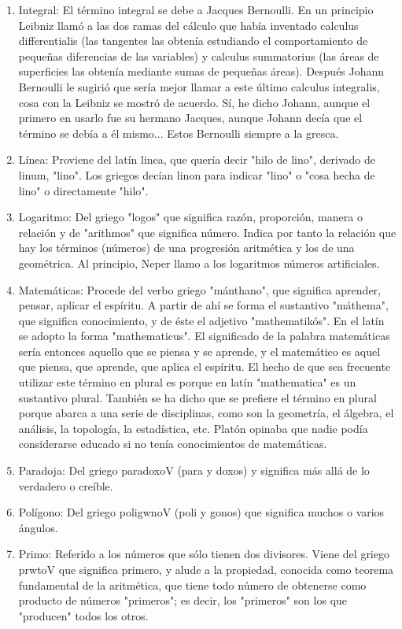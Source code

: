 \documentclass{mylib/reporte}
\begin{document}
\begin{enumerate}
	\item Integral: El término integral se debe a Jacques Bernoulli. En un principio Leibniz llamó a las dos ramas del cálculo que había inventado calculus differentialis (las tangentes las obtenía estudiando el comportamiento de pequeñas diferencias de las variables) y calculus summatorius (las áreas de superficies las obtenía mediante sumas de pequeñas áreas). Después Johann Bernoulli le sugirió que sería mejor llamar a este último calculus integralis, cosa con la Leibniz se mostró de acuerdo. Sí, he dicho Johann, aunque el primero en usarlo fue su hermano Jacques, aunque Johann decía que el término se debía a él mismo... Estos Bernoulli siempre a la gresca.
	\item Línea: Proviene del latín linea, que quería decir "hilo de lino", derivado de linum, "lino". Los griegos decían linon para indicar "lino" o "cosa hecha de lino" o directamente "hilo".
	\item Logaritmo: Del griego "logos" que significa razón, proporción, manera o relación y de "arithmos" que significa número. Indica por tanto la relación que hay los términos (números) de una progresión aritmética y los de una geométrica. Al principio, Neper llamo a los logaritmos números artificiales.
	\item Matemáticas: Procede del verbo griego "mánthano", que significa aprender, pensar, aplicar el espíritu. A partir de ahí se forma el sustantivo "máthema", que significa conocimiento, y de éste el adjetivo "mathematikós". En el latín se adopto la forma "mathematicus". El significado de la palabra matemáticas sería entonces aquello que se piensa y se aprende, y el matemático es aquel que piensa, que aprende, que aplica el espíritu. El hecho de que sea frecuente utilizar este término en plural es porque en latín "mathematica" es un sustantivo plural. También se ha dicho que se prefiere el término en plural porque abarca a una serie de disciplinas, como son la geometría, el álgebra, el análisis, la topología, la estadística, etc. Platón opinaba que nadie podía considerarse educado si no tenía conocimientos de matemáticas.
	\item Paradoja: Del griego paradoxoV (para y doxos) y significa más allá de lo verdadero o creíble.
	\item Polígono: Del griego poligwnoV (poli y gonos) que significa muchos o varios ángulos.
	\item Primo: Referido a los números que sólo tienen dos divisores. Viene del griego prwtoV que significa primero, y alude a la propiedad, conocida como teorema fundamental de la aritmética, que tiene todo número de obtenerse como producto de números "primeros"; es decir, los "primeros" son los que "producen" todos los otros.

\end{enumerate}
\end{document}
